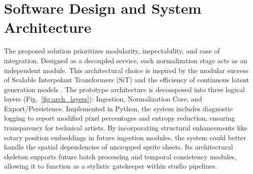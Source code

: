 \documentclass[runningheads]{llncs}
\begin{document}
\begin{table}[ht]
\footnotesize
\centering
\begin{minipage}{0.48\linewidth}
\centering
\caption{Evaluation dimensions}
\label{tab:criteria}
\end{minipage}
\hfill
\begin{minipage}{0.48\linewidth}
\centering
\caption{Recurrent failure classes}
\label{tab:failures}
\end{minipage}
\end{table}

\section{Software Design and System Architecture}

The proposed solution prioritizes modularity, inspectability, and ease of integration. Designed as a decoupled service, each normalization stage acts as an independent module. This architectural choice is inspired by the modular success of Scalable Interpolant Transformers (SiT) \cite{ma2024sit} and the efficiency of continuous latent generation models \cite{hang2025fast}. The prototype architecture is decomposed into three logical layers (Fig.~\ref{fig:arch_layers}): Ingestion, Normalization Core, and Export/Persistence. Implemented in Python, the system includes diagnostic logging to report modified pixel percentages and entropy reduction, ensuring transparency for technical artists. By incorporating structural enhancements like rotary position embeddings \cite{su2023roformer} in future ingestion modules, the system could better handle the spatial dependencies of uncropped sprite sheets. Its architectural skeleton supports future batch processing and temporal consistency modules, allowing it to function as a stylistic gatekeeper within studio pipelines.
\end{document}
